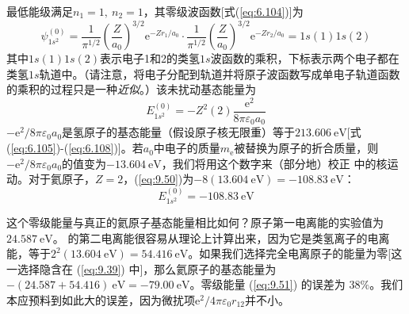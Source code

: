     最低能级满足$n_1 = 1,\: n_2 = 1$，其零级波函数[式(\ref{eq:6.104})]为
    \begin{equation}
        \psi_{1s^2}^{\left(0\right)} = \frac{1}{\pi^{1/2}}\left(\frac{Z}{a_0}\right)^{3/2} \mathrm{e}^{-Zr_1/a_0} \cdot \frac{1}{\pi^{1/2}}\left(\frac{Z}{a_0}\right)^{3/2} \mathrm{e}^{-Zr_2/a_0} = 1s\left(1\right)1s\left(2\right)
        \label{eq:9.49}
    \end{equation}
    其中$1s\left(1\right)1s\left(2\right)$表示电子1和2的类氢$1s$波函数的乘积，下标表示两个电子都在类氢$1s$轨道中。（请注意，将电子分配到轨道并将原子波函数写成单电子轨道函数的乘积的过程只是一种\textit{近似}。）该未扰动基态能量为
    \begin{equation}
        E^{\left(0\right)}_{1s^2} = -Z^2\left(2\right)\frac{\mathrm{e}^2}{8\pi\varepsilon_0a_0}
        \label{eq:9.50}
    \end{equation}
    $-\mathrm{e}^2 / 8\pi\varepsilon_0a_0$是氢原子的基态能量（假设原子核无限重）等于$213.606 \: \mathrm{eV}$[式(\ref{eq:6.105})-(\ref{eq:6.108})]。若$a_0$中电子的质量$m_{\mathrm{e}}$被替换为原子的折合质量，则$-\mathrm{e}^2 / 8\pi\varepsilon_0a_0$的值变为$-13.604 \: \mathrm{eV}$，我们将用这个数字来（部分地）校正  中的核运动。对于氦原子，$Z=2$，(\ref{eq:9.50})为$-8\left(13.604 \: \mathrm{eV}\right) = -108.83 \: \mathrm{eV}$：
    \begin{equation}
        E^{\left(0\right)}_{1s^2} = -108.83 \: \mathrm{eV}
        \label{eq:9.51}
    \end{equation}

    这个零级能量与真正的氦原子基态能量相比如何？原子第一电离能的实验值为$24.587 \: \mathrm{eV}$。 的第二电离能很容易从理论上计算出来，因为它是类氢离子的电离能，等于$2^2\left(13.604 \: \mathrm{eV}\right) = 54.416 \: \mathrm{eV}$。如果我们选择完全电离原子的能量为零[这一选择隐含在 (\ref{eq:9.39}) 中]，那么氦原子的基态能量为$-\left(24.587 + 54.416\right) \: \mathrm{eV} = -79.00 \: \mathrm{eV}$。零级能量 (\ref{eq:9.51}) 的误差为 $38\%$。我们本应预料到如此大的误差，因为微扰项$\mathrm{e}^2 / 4\pi\varepsilon_0r_{12}$并不小。


